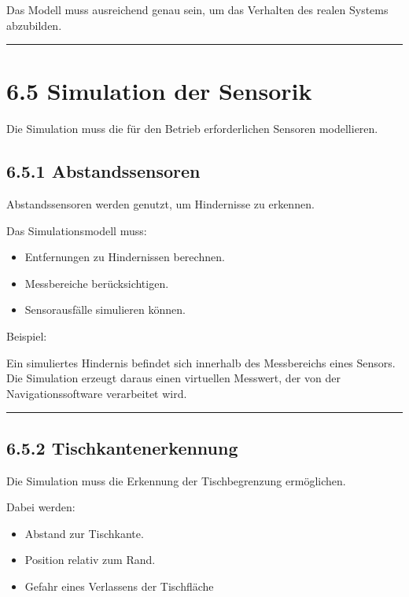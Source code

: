 \documentclass[
]{article}
\providecommand{\tightlist}{%
  \setlength{\itemsep}{0pt}\setlength{\parskip}{0pt}}
\begin{document}
Das Modell muss ausreichend genau sein, um das Verhalten des realen
Systems abzubilden.

\begin{center}\rule{0.5\linewidth}{0.5pt}\end{center}

\section{6.5 Simulation der Sensorik}\label{simulation-der-sensorik}

Die Simulation muss die für den Betrieb erforderlichen Sensoren
modellieren.

\subsection{6.5.1 Abstandssensoren}\label{abstandssensoren}

Abstandssensoren werden genutzt, um Hindernisse zu erkennen.

Das Simulationsmodell muss:

\begin{itemize}
\tightlist
\item
  Entfernungen zu Hindernissen berechnen.
\item
  Messbereiche berücksichtigen.
\item
  Sensorausfälle simulieren können.
\end{itemize}

Beispiel:

Ein simuliertes Hindernis befindet sich innerhalb des Messbereichs eines
Sensors. Die Simulation erzeugt daraus einen virtuellen Messwert, der
von der Navigationssoftware verarbeitet wird.

\begin{center}\rule{0.5\linewidth}{0.5pt}\end{center}

\subsection{6.5.2 Tischkantenerkennung}\label{tischkantenerkennung-1}

Die Simulation muss die Erkennung der Tischbegrenzung ermöglichen.

Dabei werden:

\begin{itemize}
\tightlist
\item
  Abstand zur Tischkante.
\item
  Position relativ zum Rand.
\item
  Gefahr eines Verlassens der Tischfläche
\end{itemize}
\end{document}
